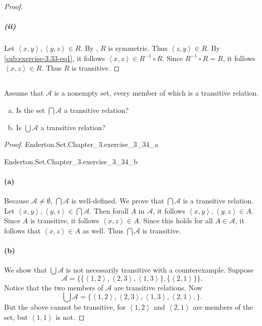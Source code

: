 \documentclass{report}
\newcommand{\pair}[1]{\left< #1 \right>}
\begin{document}
\begin{proof}
    \subparagraph{(ii)}%

      Let $\pair{x, y}, \pair{y, z} \in R$.
      By , $R$ is symmetric.
      Thus $\pair{z, y} \in R$.
      By \eqref{sub:exercise-3.33-eq1}, it follows
        $\pair{x, z} \in R^{-1} \circ R$.
      Since $R^{-1} \circ R = R$, it follows $\pair{x, z} \in R$.
      Thus $R$ is transitive.

\end{proof}

\subsection{}%

Assume that $\mathscr{A}$ is a nonempty set, every member of which is a
  transitive relation.

\begin{enumerate}[(a)]
  \item Is the set $\bigcap{\mathscr{A}}$ a transitive relation?
  \item Is $\bigcup{\mathscr{A}}$ a transitive relation?
\end{enumerate}

\begin{proof}

  \statementpadding

    {Enderton.Set.Chapter\_3.exercise\_3\_34\_a}

    {Enderton.Set.Chapter\_3.exercise\_3\_34\_b}

  \paragraph{(a)}%

    Because $\mathscr{A} \neq \emptyset$, $\bigcap{\mathscr{A}}$ is
      well-defined.
    We prove that $\bigcap{\mathscr{A}}$ is a transitive relation.
    Let $\pair{x, y}, \pair{y, z} \in \bigcap{\mathscr{A}}$.
    Then forall $A$ in $\mathscr{A}$, it follows
      $\pair{x, y}, \pair{y, z} \in A$.
    Since $A$ is transitive, it follows $\pair{x, z} \in A$.
    Since this holds for all $A \in \mathscr{A}$, it follows that
      $\pair{x, z} \in A$ as well.
    Thus $\bigcap{\mathscr{A}}$ is transitive.

  \paragraph{(b)}%

    We show that $\bigcup{\mathscr{A}}$ is not necessarily transitive with a
      counterexample.
    Suppose $$\mathscr{A} = \{
      \{\pair{1, 2}, \pair{2, 3}, \pair{1, 3}\}, \{\pair{2, 1}\}
    \}.$$
    Notice that the two members of $\mathscr{A}$ are transitive relations.
    Now $$\bigcup{\mathscr{A}} = \{
      \pair{1, 2}, \pair{2, 3}, \pair{1, 3}, \pair{2, 1},
    \}.$$
    But the above cannot be transitive, for $\pair{1, 2}$ and $\pair{2, 1}$ are
      members of the set, but $\pair{1, 1}$ is not.

\end{proof}
\end{document}
